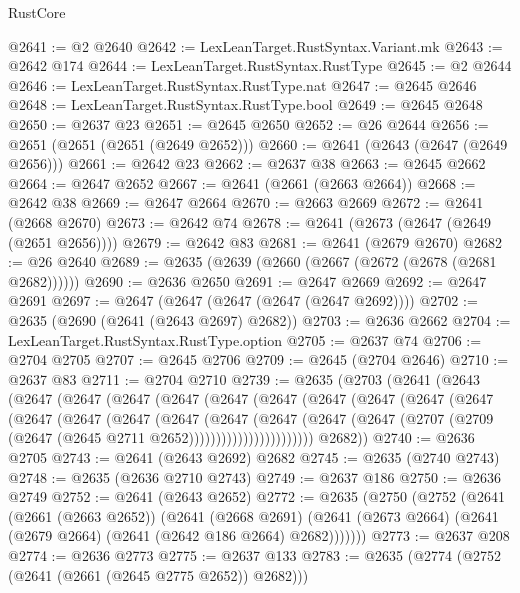 \begin{lexlean}{RustCore}
\begin{coremodule}
@2641 := @2 @2640
@2642 := LexLeanTarget.RustSyntax.Variant.mk
@2643 := @2642 @174
@2644 := LexLeanTarget.RustSyntax.RustType
@2645 := @2 @2644
@2646 := LexLeanTarget.RustSyntax.RustType.nat
@2647 := @2645 @2646
@2648 := LexLeanTarget.RustSyntax.RustType.bool
@2649 := @2645 @2648
@2650 := @2637 @23
@2651 := @2645 @2650
@2652 := @26 @2644
@2656 := @2651 (@2651 (@2651 (@2649 @2652)))
@2660 := @2641 (@2643 (@2647 (@2649 @2656)))
@2661 := @2642 @23
@2662 := @2637 @38
@2663 := @2645 @2662
@2664 := @2647 @2652
@2667 := @2641 (@2661 (@2663 @2664))
@2668 := @2642 @38
@2669 := @2647 @2664
@2670 := @2663 @2669
@2672 := @2641 (@2668 @2670)
@2673 := @2642 @74
@2678 := @2641 (@2673 (@2647 (@2649 (@2651 @2656))))
@2679 := @2642 @83
@2681 := @2641 (@2679 @2670)
@2682 := @26 @2640
@2689 := @2635 (@2639 (@2660 (@2667 (@2672 (@2678 (@2681 @2682))))))
@2690 := @2636 @2650
@2691 := @2647 @2669
@2692 := @2647 @2691
@2697 := @2647 (@2647 (@2647 (@2647 (@2647 @2692))))
@2702 := @2635 (@2690 (@2641 (@2643 @2697) @2682))
@2703 := @2636 @2662
@2704 := LexLeanTarget.RustSyntax.RustType.option
@2705 := @2637 @74
@2706 := @2704 @2705
@2707 := @2645 @2706
@2709 := @2645 (@2704 @2646)
@2710 := @2637 @83
@2711 := @2704 @2710
@2739 := @2635
    (@2703
      (@2641
        (@2643
          (@2647
            (@2647
              (@2647
                (@2647
                  (@2647
                    (@2647
                      (@2647
                        (@2647
                          (@2647
                            (@2647
                              (@2647
                                (@2647
                                  (@2647
                                    (@2647
                                      (@2647
                                        (@2647
                                          (@2647
                                            (@2647
                                              (@2707
                                                (@2709
                                                  (@2647 (@2645 @2711 @2652)))))))))))))))))))))))
        @2682))
@2740 := @2636 @2705
@2743 := @2641 (@2643 @2692) @2682
@2745 := @2635 (@2740 @2743)
@2748 := @2635 (@2636 @2710 @2743)
@2749 := @2637 @186
@2750 := @2636 @2749
@2752 := @2641 (@2643 @2652)
@2772 := @2635
    (@2750
      (@2752
        (@2641
          (@2661 (@2663 @2652))
          (@2641
            (@2668 @2691)
            (@2641 (@2673 @2664) (@2641 (@2679 @2664) (@2641 (@2642 @186 @2664) @2682)))))))
@2773 := @2637 @208
@2774 := @2636 @2773
@2775 := @2637 @133
@2783 := @2635 (@2774 (@2752 (@2641 (@2661 (@2645 @2775 @2652)) @2682)))

\end{coremodule}
\end{lexlean}

